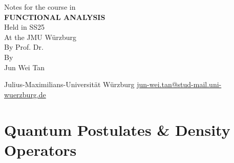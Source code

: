 \documentclass[twoside,symmetric, openany, 12pt]{./tuftebook}
\theoremstyle{definition}
\theoremstyle{definition}
\theoremstyle{definition}
\begin{document}
	\begin{titlepage}
		{\begingroup%
			\centering
			{\Large Notes for the course in}\\[\baselineskip]
			{\Huge\bfseries FUNCTIONAL ANALYSIS}\\[\baselineskip]
			{\Large Held in SS25\\ At the JMU Würzburg\\ By Prof. Dr. }\\[\baselineskip]
			{\LARGE By}\\[\baselineskip]
			{\LARGE Jun Wei Tan}\par
			\vfill
			{Julius-Maximilians-Universit\"{a}t W\"{u}rzburg}
			\vfill
			{\small\sffamily \href{mailto:jun-wei.tan@stud-mail.uni-wuerzburg.de}{jun-wei.tan@stud-mail.uni-wuerzburg.de}}\par
			\endgroup}
	\end{titlepage}
	\restoregeometry
	\tableofcontents
\chapter{Quantum Postulates \& Density Operators}
\end{document}
